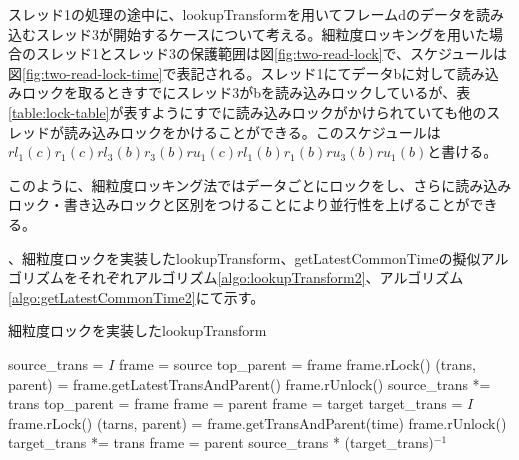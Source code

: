 \documentclass[a4paper]{jreport}	%
\begin{document}
スレッド1の処理の途中に、lookupTransformを用いてフレームdのデータを読み込むスレッド3が開始するケースについて考える。細粒度ロッキングを用いた場合のスレッド1とスレッド3の保護範囲は図\ref{fig:two-read-lock}で、スケジュールは図\ref{fig:two-read-lock-time}で表記される。スレッド1にてデータbに対して読み込みロックを取るときすでにスレッド3がbを読み込みロックしているが、表\ref{table:lock-table}が表すようにすでに読み込みロックがかけられていても他のスレッドが読み込みロックをかけることができる。このスケジュールは$rl_1(c)r_1(c)rl_3(b)r_3(b)ru_1(c)rl_1(b)r_1(b)ru_3(b)ru_1(b)$と書ける。


このように、細粒度ロッキング法ではデータごとにロックをし、さらに読み込みロック・書き込みロックと区別をつけることにより並行性を上げることができる。

、細粒度ロックを実装したlookupTransform、getLatestCommonTimeの擬似アルゴリズムをそれぞれアルゴリズム\ref{algo:lookupTransform2}、アルゴリズム\ref{algo:getLatestCommonTime2}にて示す。

\begin{algorithm}
  \caption{細粒度ロックを実装したlookupTransform}\label{algo:lookupTransform2}
\begin{algorithmic}[1]
	\EndIf
	\State source\_trans = $I$
	\State frame = source
	\State top\_parent = frame
	\State frame.rLock()
	\State (trans, parent) = frame.getLatestTransAndParent() 
	\State frame.rUnlock()
	\State source\_trans *= trans
	\State top\_parent = frame
	\State frame = parent
	\EndWhile
	\State frame = target
	\State target\_trans = $I$
	\State frame.rLock()
	\State (tarns, parent) = frame.getTransAndParent(time)
	\State frame.rUnlock()
	\State target\_trans *= trans
	\State frame = parent
	\EndWhile
	\State \Return source\_trans * (target\_trans)$^{-1}$
	\EndFunction
\end{algorithmic}
\end{algorithm}
\end{document}
